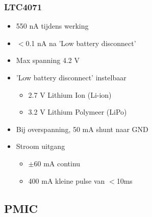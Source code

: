     \begin{frame}
        \frametitle{LTC4071}
        \begin{itemize}
            \item 550 nA tijdens werking
            \item $<$0.1 nA na 'Low battery disconnect'
            \item Max spanning 4.2 V
            \item 'Low battery disconnect' instelbaar
                \begin{itemize}
                    \item 2.7 V Lithium Ion (Li-ion)
                    \item 3.2 V Lithium Polymeer (LiPo)
                \end{itemize}
            \item Bij overspanning, 50 mA shunt naar GND
            \item Stroom uitgang
                \begin{itemize}
                    \item $\pm 60$ mA continu 
                    \item 400 mA kleine pulse van $<$10ms
                \end{itemize}
        \end{itemize}

    \end{frame}

    \subsection{PMIC}

    
        
    
